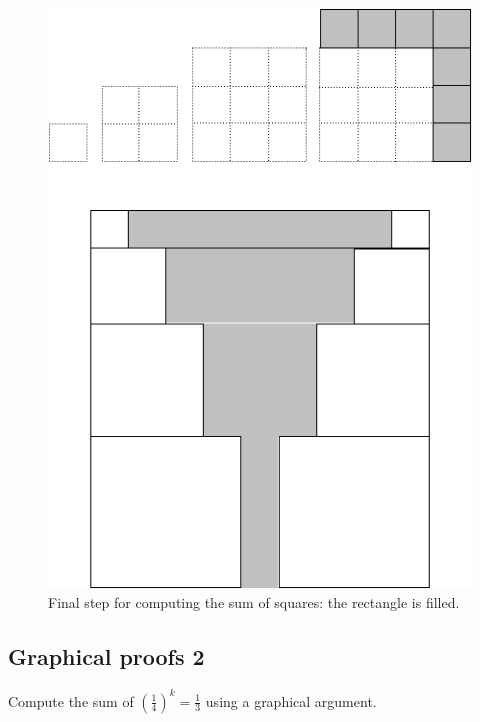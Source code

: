 \begin{figure}[ht]
\begin{center}
       \includegraphics[scale=0.4]{FiguresMaths/SumSquares5}
\caption{Final step for computing the sum of squares: the rectangle is filled.}
       \label{fig:sumSquares5}
\end{center}
\end{figure}

\subsection{Graphical proofs 2}

Compute the sum of $(\frac{1}{4})^k = \frac{1}{3} $ using a graphical argument.
\bigskip

